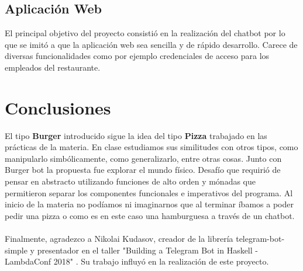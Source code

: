 \documentclass[a4paper,12pt]{article}
\begin{document}
\subsection{Aplicación Web}

El principal objetivo del proyecto consistió en la realización del chatbot por lo que se imitó a que la aplicación web sea sencilla y de rápido desarrollo. Carece de diversas funcionalidades como por ejemplo credenciales de acceso para los empleados del restaurante.

\section{Conclusiones}

El tipo \textbf{Burger} introducido sigue la idea del tipo \textbf{Pizza} trabajado en las prácticas de la materia. En clase estudiamos sus similitudes con otros tipos, como manipularlo simbólicamente, como generalizarlo, entre otras cosas. Junto con Burger bot la propuesta fue explorar el mundo físico. Desafío que requirió de pensar en abstracto utilizando funciones de alto orden y mónadas que permitieron separar los componentes funcionales e imperativos del programa. 
Al inicio de la materia no podíamos ni imaginarnos que al terminar íbamos a poder pedir una pizza o como es en este caso una hamburguesa a través de un chatbot.
\\\\
Finalmente, agradezco a Nikolai Kudasov, creador de la librería telegram-bot-simple y presentador en el taller "Building a Telegram Bot in Haskell - LambdaConf 2018" \cite{lambda-conf-1}\cite{lambda-conf-2}. Su trabajo influyó en la realización de este proyecto.

\pagebreak
%
\nocite{postgres-simple-tutorial}
\nocite{postgresql-simple-examples}
\nocite{fizruk-telegram-bot-simple}
\nocite{spock-tutorial}
\nocite{blaze-html-tutorial}


\end{document}
